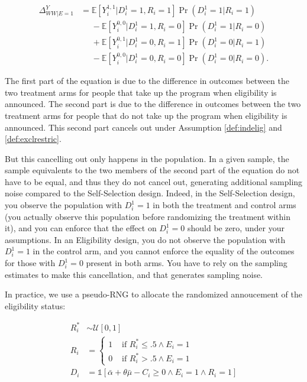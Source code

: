 \documentclass[]{book}
\newcommand{\uns}[1]{\mathds{1}[ #1 ]}
\newcommand{\esp}[1]{\mathbb{E}[ #1 ]}
\theoremstyle{definition}
\theoremstyle{definition}
\theoremstyle{definition}
\theoremstyle{remark}
\let\BeginKnitrBlock\begin \let\EndKnitrBlock\end
\begin{document}
\begin{align*}
  \Delta^Y_{WW|E=1} & = \esp{Y_i^{1,1}|D_i^1=1,R_i=1}\Pr(D^1_i=1|R_i=1)\\
                    & \phantom{=}-\esp{Y_i^{0,0}|D_i^1=1,R_i=0}\Pr(D^1_i=1|R_i=0) \\
                    & \phantom{=}+ \esp{Y_i^{0,1}|D_i^1=0,R_i=1}\Pr(D^1_i=0|R_i=1)\\
                    & \phantom{=}-\esp{Y_i^{0,0}|D_i^1=0,R_i=0}\Pr(D^1_i=0|R_i=0).  
\end{align*}

The first part of the equation is due to the difference in outcomes
between the two treatment arms for people that take up the program when
eligibility is announced. The second part is due to the difference in
outcomes between the two treatment arms for people that do not take up
the program when eligibility is announced. This second part cancels out
under Assumption \ref{def:indelig} and \ref{def:exclrestric}.

But this cancelling out only happens in the population. In a given
sample, the sample equivalents to the two members of the second part of
the equation do not have to be equal, and thus they do not cancel out,
generating additional sampling noise compared to the Self-Selection
design. Indeed, in the Self-Selection design, you observe the population
with \(D_i^1=1\) in both the treatment and control arms (you actually
observe this population before randomizing the treatment within it), and
you can enforce that the effect on \(D_i^1=0\) should be zero, under
your assumptions. In an Eligibility design, you do not observe the
population with \(D_i^1=1\) in the control arm, and you cannot enforce
the equality of the outcomes for those with \(D_i^1=0\) present in both
arms. You have to rely on the sampling estimates to make this
cancellation, and that generates sampling noise.

\BeginKnitrBlock{remark}
\iffalse{} {Remark. } \fi{}In practice, we use a pseudo-RNG to allocate
the randomized annoucement of the eligibility status:
\EndKnitrBlock{remark}

\begin{align*}
  R_i^* & \sim \mathcal{U}[0,1]\\
  R_i & = 
  \begin{cases}
    1 & \text{ if } R_i^*\leq .5 \land E_i=1\\
    0 & \text{ if } R_i^*> .5 \land E_i=1
  \end{cases} \\
  D_i & = \uns{\bar{\alpha}+\theta\bar{\mu}-C_i\geq0 \land E_i=1 \land R_i=1}
\end{align*}
\end{document}
